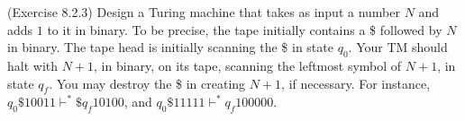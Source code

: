 \documentclass[10pt]{homework}
\begin{document}

\begin{problem} (Exercise 8.2.3) Design a Turing machine that takes as input a
  number $N$ and adds $1$ to it in binary.
  To be precise, the tape initially contains a \$ followed by $N$ in binary.
  The tape head is initially scanning the \$ in state $q_{0}$.
  Your TM should halt with $N+1$, in binary, on its tape, scanning the leftmost
  symbol of $N + 1$, in state $q_{f}$.
  You may destroy the \$ in creating $N + 1$, if necessary.
  For instance, $q_{0}\$10011 \vdash^{*} \$q_{f}10100$, and
  $q_{0}\$11111 \vdash^{*} q_{f}100000$.
\end{problem}
\end{document}
